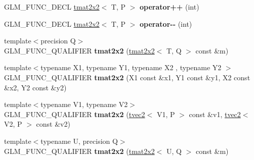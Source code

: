 \begin{DoxyCompactItemize}
\item 
G\+L\+M\+\_\+\+F\+U\+N\+C\+\_\+\+D\+E\+CL \hyperlink{structglm_1_1detail_1_1tmat2x2}{tmat2x2}$<$ T, P $>$ {\bfseries operator++} (int)\hypertarget{structglm_1_1detail_1_1tmat2x2_ab0857ca1fc8ebaf4f2999d64837efb08}{}\label{structglm_1_1detail_1_1tmat2x2_ab0857ca1fc8ebaf4f2999d64837efb08}

\item 
G\+L\+M\+\_\+\+F\+U\+N\+C\+\_\+\+D\+E\+CL \hyperlink{structglm_1_1detail_1_1tmat2x2}{tmat2x2}$<$ T, P $>$ {\bfseries operator-\/-\/} (int)\hypertarget{structglm_1_1detail_1_1tmat2x2_a72d5fa6f7e0f9745d8615781a0f18d58}{}\label{structglm_1_1detail_1_1tmat2x2_a72d5fa6f7e0f9745d8615781a0f18d58}

\item 
{\footnotesize template$<$precision Q$>$ }\\G\+L\+M\+\_\+\+F\+U\+N\+C\+\_\+\+Q\+U\+A\+L\+I\+F\+I\+ER {\bfseries tmat2x2} (\hyperlink{structglm_1_1detail_1_1tmat2x2}{tmat2x2}$<$ T, Q $>$ const \&m)\hypertarget{structglm_1_1detail_1_1tmat2x2_ae0e7fef5869427ad788ea783dc2c87cc}{}\label{structglm_1_1detail_1_1tmat2x2_ae0e7fef5869427ad788ea783dc2c87cc}

\item 
{\footnotesize template$<$typename X1, typename Y1, typename X2 , typename Y2 $>$ }\\G\+L\+M\+\_\+\+F\+U\+N\+C\+\_\+\+Q\+U\+A\+L\+I\+F\+I\+ER {\bfseries tmat2x2} (X1 const \&x1, Y1 const \&y1, X2 const \&x2, Y2 const \&y2)\hypertarget{structglm_1_1detail_1_1tmat2x2_a9f87e4050f867fd35e7440996f569ab9}{}\label{structglm_1_1detail_1_1tmat2x2_a9f87e4050f867fd35e7440996f569ab9}

\item 
{\footnotesize template$<$typename V1, typename V2$>$ }\\G\+L\+M\+\_\+\+F\+U\+N\+C\+\_\+\+Q\+U\+A\+L\+I\+F\+I\+ER {\bfseries tmat2x2} (\hyperlink{structglm_1_1detail_1_1tvec2}{tvec2}$<$ V1, P $>$ const \&v1, \hyperlink{structglm_1_1detail_1_1tvec2}{tvec2}$<$ V2, P $>$ const \&v2)\hypertarget{structglm_1_1detail_1_1tmat2x2_a469a15bf38fd19d4f7ad48f8599ea554}{}\label{structglm_1_1detail_1_1tmat2x2_a469a15bf38fd19d4f7ad48f8599ea554}

\item 
{\footnotesize template$<$typename U, precision Q$>$ }\\G\+L\+M\+\_\+\+F\+U\+N\+C\+\_\+\+Q\+U\+A\+L\+I\+F\+I\+ER {\bfseries tmat2x2} (\hyperlink{structglm_1_1detail_1_1tmat2x2}{tmat2x2}$<$ U, Q $>$ const \&m)\hypertarget{structglm_1_1detail_1_1tmat2x2_a0eed2a609688233e8c0f3abe1e32d036}{}\label{structglm_1_1detail_1_1tmat2x2_a0eed2a609688233e8c0f3abe1e32d036}


\end{DoxyCompactItemize}
